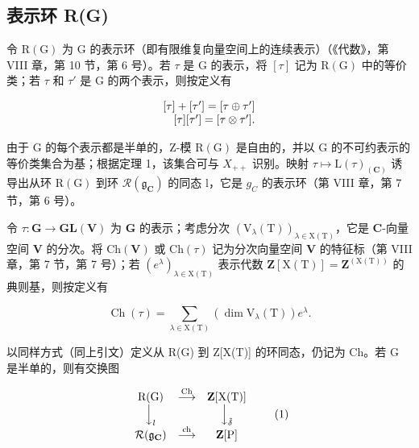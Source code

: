 \subsection{表示环 R(G)}

令 \(\mathrm{R}(\mathrm{G})\) 为 \(\mathrm{G}\) 的表示环（即有限维复向量空间上的连续表示）（《代数》，第 VIII 章，第 10 节，第 6 号）。若 \(\tau\) 是 \(\mathrm{G}\) 的表示，将 \([\tau]\) 记为 \(\mathrm{R}(\mathrm{G})\) 中的等价类；若 \(\tau\) 和 \(\tau'\) 是 \(\mathrm{G}\) 的两个表示，则按定义有

\[
\begin{array}{r} [ \tau ] + [ \tau^ {\prime} ] = [ \tau \oplus \tau^ {\prime} ] \\ \relax [ \tau ] [ \tau^ {\prime} ] = [ \tau \otimes \tau^ {\prime} ]. \end{array}
\]

由于 G 的每个表示都是半单的，Z-模 \(\mathrm{R}(\mathrm{G})\) 是自由的，并以 G 的不可约表示的等价类集合为基；根据定理 1，该集合可与 \(X_{++}\) 识别。映射 \(\tau \mapsto \mathrm{L}(\tau)_{(\mathbf{C})}\) 诱导出从环 \(\mathrm{R}(\mathrm{G})\) 到环 \(\mathcal{R}(\mathfrak{g}_{\mathbf{C}})\) 的同态 l，它是 \(g_{C}\) 的表示环（第 VIII 章，第 7 节，第 6 号）。

令 \(\tau : \mathbf{G} \to \mathbf{GL}(\mathbf{V})\) 为 \(\mathbf{G}\) 的表示；考虑分次 \((\mathrm{V}_{\lambda}(\mathrm{T}))_{\lambda \in \mathrm{X}(\mathrm{T})}\)，它是 \(\mathbf{C}\)-向量空间 \(\mathbf{V}\) 的分次。将 \(\mathrm{Ch}(\mathbf{V})\) 或 \(\mathrm{Ch}(\tau)\) 记为分次向量空间 \(\mathbf{V}\) 的特征标（第 VIII 章，第 7 节，第 7 号）；若 \((e^{\lambda})_{\lambda \in \mathrm{X}(\mathrm{T})}\) 表示代数 \(\mathbf{Z}[\mathrm{X}(\mathrm{T})] = \mathbf{Z}^{(\mathrm{X}(\mathrm{T}))}\) 的典则基，则按定义有

\[
\operatorname{Ch} (\tau) = \sum_ {\lambda \in \mathrm{X} (\mathrm{T})} \left(\dim \mathrm{V} _ {\lambda} (\mathrm{T})\right) e ^ {\lambda}.
\]

以同样方式（同上引文）定义从 R(G) 到 Z[X(T)] 的环同态，仍记为 Ch。若 G 是半单的，则有交换图

\[
\begin{array}{c c c} \mathrm{R(G)} & \stackrel {{\mathrm{Ch}}} {{\longrightarrow}} & \mathbf {Z} [ \mathrm{X(T)} ] \\ \Big \downarrow_ {l} & & \Big \downarrow_ {\tilde {\delta}} \\ \mathcal {R} (\mathfrak {g} _ {\mathbf {C}}) & \stackrel {{\mathrm{ch}}} {{\longrightarrow}} & \mathbf {Z} [ \mathrm{P} ] \end{array}\tag{1}
\]

